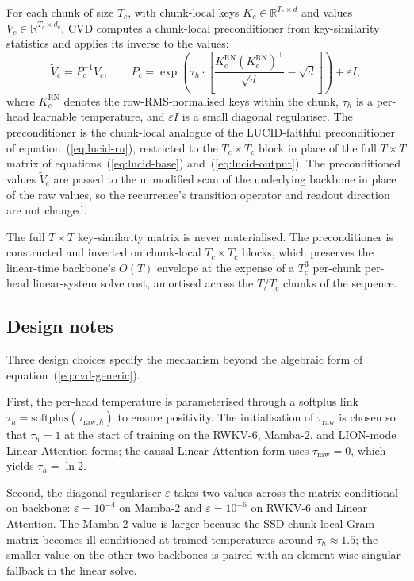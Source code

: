 For each chunk of size $T_{c}$, with chunk-local keys
$K_{c} \in \mathbb{R}^{T_{c} \times d}$ and values
$V_{c} \in \mathbb{R}^{T_{c} \times d_{v}}$, CVD computes a
chunk-local preconditioner from key-similarity statistics and
applies its inverse to the values:
\begin{equation}\label{eq:cvd-generic}
\tilde{V}_{c} = P_{c}^{-1} V_{c},
\qquad
P_{c} = \exp\!\left( \tau_{h} \cdot \left[ \frac{K_{c}^{\mathrm{RN}} (K_{c}^{\mathrm{RN}})^{\top}}{\sqrt{d}} - \sqrt{d} \right] \right) + \varepsilon I,
\end{equation}
where $K_{c}^{\mathrm{RN}}$ denotes the row-RMS-normalised keys
within the chunk, $\tau_{h}$ is a per-head learnable temperature,
and $\varepsilon I$ is a small diagonal regulariser. The
preconditioner is the chunk-local analogue of the LUCID-faithful
preconditioner of equation~(\ref{eq:lucid-rn}), restricted to the
$T_{c} \times T_{c}$ block in place of the full $T \times T$
matrix of equations~(\ref{eq:lucid-base})
and~(\ref{eq:lucid-output}). The preconditioned values
$\tilde{V}_{c}$ are passed to the unmodified scan of the
underlying backbone in place of the raw values, so the
recurrence's transition operator and readout direction are not
changed.

The full $T \times T$ key-similarity matrix is never materialised.
The preconditioner is constructed and inverted on chunk-local
$T_{c} \times T_{c}$ blocks, which preserves the linear-time
backbone's $O(T)$ envelope at the expense of a $T_{c}^{3}$
per-chunk per-head linear-system solve cost, amortised across the
$T / T_{c}$ chunks of the sequence.

\subsection{Design notes}

Three design choices specify the mechanism beyond the algebraic
form of equation~(\ref{eq:cvd-generic}).

First, the per-head temperature is parameterised through a
softplus link
$\tau_{h} = \mathrm{softplus}(\tau_{\mathrm{raw}, h})$ to ensure
positivity. The initialisation of $\tau_{\mathrm{raw}}$ is chosen
so that $\tau_{h} = 1$ at the start of training on the RWKV-6,
Mamba-2, and LION-mode Linear Attention forms; the causal Linear
Attention form uses $\tau_{\mathrm{raw}} = 0$, which yields
$\tau_{h} = \ln 2$.

Second, the diagonal regulariser $\varepsilon$ takes two values
across the matrix conditional on backbone: $\varepsilon = 10^{-4}$
on Mamba-2 and $\varepsilon = 10^{-6}$ on RWKV-6 and Linear
Attention. The Mamba-2 value is larger because the SSD chunk-local
Gram matrix becomes ill-conditioned at trained temperatures around
$\tau_{h} \approx 1.5$; the smaller value on the other two
backbones is paired with an element-wise singular fallback in the
linear solve.

